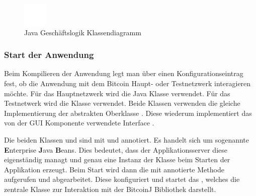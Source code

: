 \begin{figure}[H]
\centering
\includegraphics[width=1\linewidth]{Figures/umsetzung_btc/btc_businesslogic_pdf}
\decoRule
\caption{Java Geschäftslogik Klassendiagramm}
\label{fig:btc_businesslogic}
\end{figure}

\subsubsection{Start der Anwendung}
Beim Kompilieren der Anwendung legt man über einen Konfigurationseintrag fest, ob die Anwendung mit dem Bitcoin Haupt- oder Testnetzwerk interagieren möchte.
Für das Hauptnetzwerk wird die Java Klasse  verwendet. Für das Testnetwerk wird die Klasse  verwendet. Beide Klassen verwenden die gleiche Implementierung der abstrakten Oberklasse . Diese wiederum implementiert das von der GUI Komponente verwendete Interface .


Die beiden Klassen  und  sind mit  und  annotiert. Es handelt sich um sogenannte \textbf{E}nterprise \textbf{J}ava \textbf{B}eans. Dies bedeutet, dass der Applikationsserver diese eigenständig managt und genau eine Instanz der Klasse beim Starten der Applikation erzeugt. Beim Start wird dann die mit  annotierte  Methode aufgerufen und abgearbeitet. Diese konfiguriert und startet das , welches die zentrale Klasse zur Interaktion mit der BitcoinJ Bibliothek darstellt.

